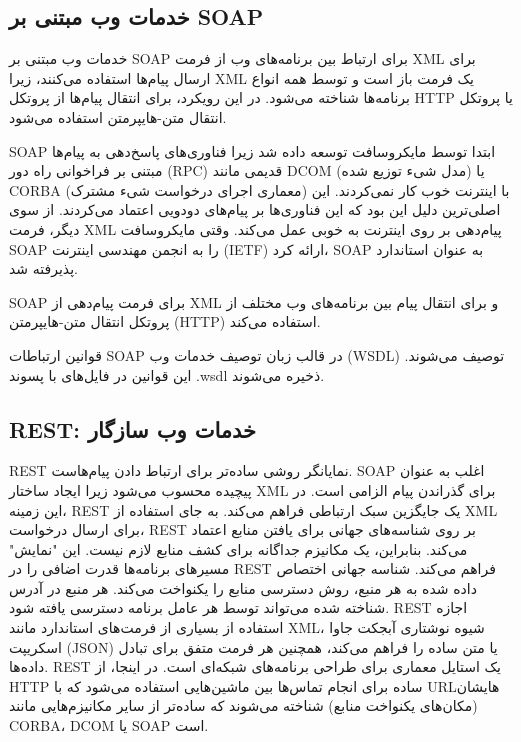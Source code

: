 \documentclass{book}
\begin{document}
            \subsection{خدمات وب مبتنی بر SOAP}

                خدمات وب مبتنی بر SOAP برای ارتباط بین برنامه‌های وب از فرمت XML برای ارسال پیام‌ها استفاده می‌کنند، زیرا XML یک فرمت باز است و توسط همه انواع برنامه‌ها شناخته می‌شود. در این رویکرد، برای انتقال پیام‌ها از پروتکل HTTP یا پروتکل انتقال متن-هایپرمتن استفاده می‌شود.

                SOAP ابتدا توسط مایکروسافت توسعه داده شد زیرا فناوری‌های پاسخ‌دهی به پیام‌ها مبتنی بر فراخوانی راه دور (RPC) قدیمی مانند DCOM (مدل شیء توزیع شده) یا CORBA (معماری اجرای درخواست شیء مشترک) با اینترنت خوب کار نمی‌کردند. این اصلی‌ترین دلیل این بود که این فناوری‌ها بر پیام‌های دودویی اعتماد می‌کردند. از سوی دیگر، فرمت XML پیام‌دهی بر روی اینترنت به خوبی عمل می‌کند. وقتی مایکروسافت SOAP را به انجمن مهندسی اینترنت (IETF) ارائه کرد، SOAP به عنوان استاندارد پذیرفته شد.

                \begin{addinfo}
                    
                    SOAP برای فرمت پیام‌دهی از XML و برای انتقال پیام بین برنامه‌های وب مختلف از پروتکل انتقال متن-هایپرمتن (HTTP) استفاده می‌کند.

                \end{addinfo}

                قوانین ارتباطات SOAP در قالب زبان توصیف خدمات وب (WSDL) توصیف می‌شوند. این قوانین در فایل‌های با پسوند .wsdl ذخیره می‌شوند.

            \subsection{REST: خدمات وب سازگار}

            REST نمایانگر روشی ساده‌تر برای ارتباط دادن پیام‌هاست. SOAP اغلب به عنوان پیچیده محسوب می‌شود زیرا ایجاد ساختار XML برای گذراندن پیام الزامی است. در این زمینه، REST یک جایگزین سبک ارتباطی فراهم می‌کند. به جای استفاده از XML برای ارسال درخواست، REST بر روی شناسه‌های جهانی برای یافتن منابع اعتماد می‌کند. بنابراین، یک مکانیزم جداگانه برای کشف منابع لازم نیست. این "نمایش" مسیرهای برنامه‌ها قدرت اضافی را در REST فراهم می‌کند. شناسه جهانی اختصاص داده شده به هر منبع، روش دسترسی منابع را یکنواخت می‌کند. هر منبع در آدرس شناخته شده می‌تواند توسط هر عامل برنامه دسترسی یافته شود. REST اجازه استفاده از بسیاری از فرمت‌های استاندارد مانند XML، شیوه نوشتاری آبجکت جاوا اسکریپت (JSON) یا متن ساده را فراهم می‌کند، همچنین هر فرمت متفق برای تبادل داده‌ها. REST یک استایل معماری برای طراحی برنامه‌های شبکه‌ای است. در اینجا، از HTTP ساده برای انجام تماس‌ها بین ماشین‌هایی استفاده می‌شود که با URL‌هایشان (مکان‌های یکنواخت منابع) شناخته می‌شوند که ساده‌تر از سایر مکانیزم‌هایی مانند CORBA، DCOM یا SOAP است.
\end{document}
